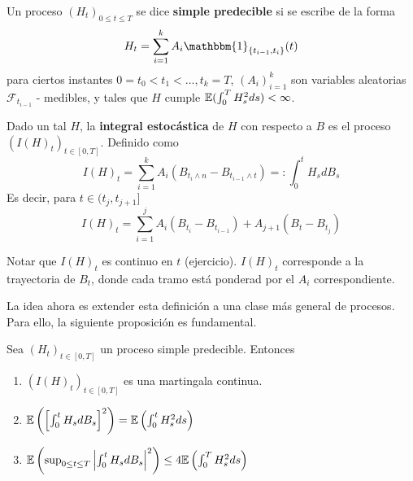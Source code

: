 \begin{definition}
        Un proceso $(H_t)_{0 \le  t \le T}$ se dice \textbf{simple predecible} si se escribe de la forma 
        \begin{equation*}
                H_t = \sum_{i=1}^{k} A_i \mathbbm{1}_{\{ t_{i-1}, t_i \}} (t)
        \end{equation*}
        para ciertos instantes $0 = t_0 < t_1 < \ldots, t_k = T$, $(A_i)_{i=1}^{k}$ son variables 
        aleatorias $\mathcal{F}_{t_{i -1}}$ - medibles, y tales que $H$ cumple $\mathbb{E}(
        \int_{0}^{T} H_s^{2} ds) < \infty$.
\end{definition}

\begin{definition}
        Dado un tal $H$, la \textbf{integral estocástica} de $H$ con respecto a
        $B$ es el proceso $\left(I(H)_t \right)_{t \in [0,T]}$. Definido como 
        \begin{equation*}
                I(H)_t = \sum_{i=1}^{k} A_i \left( B_{t_i \wedge n} - B_{t_{i-1} \wedge t} \right) 
                =: \int_{0}^{t} H_s dB_s
        \end{equation*}
        Es decir, para $t \in (t_j, t_{j+1}]$ 
        \begin{equation*}
                I(H)_t = \sum_{i=1}^{j} A_i\left( B_{t_i} - B_{t_{i-1}}  \right) + A_{j+1}(B_t - B_{t_{j}})
        \end{equation*}
\end{definition}

Notar que $I(H)_t$ es continuo en $t$ (ejercicio). $I(H)_{t}$ corresponde a la trayectoria de $B_t$, donde 
cada tramo está ponderad por el $A_i$ correspondiente. 

\newp La idea ahora es extender esta definición a una clase más general de procesos. Para ello, la siguiente
proposición es fundamental. 

\begin{proposition}
        Sea $(H_t)_{t \in [0,T]} $ un proceso simple predecible. Entonces
        \begin{enumerate}
                \item \label{ie:i}$(I(H)_t)_{t \in [0,T]}$ es una martingala continua. 
                \item \label{ie:ii} $\mathbb{E} \left( \left[ \int_{0}^{t} H_s dB_s   \right]^{2} \right)
                        = \mathbb{E} \left( \int_{0}^{t} H^2_s ds\right)$
                \item \label{ie:iii} $\mathbb{E} \left( \sup_{0 \le  t \le T} \abs{
                                \int_{0}^{t} H_s dB_s}^{2} \right)   \le  4 \mathbb{E}
                        \left( \int_{0}^{T} H^2_s ds \right)  $  
        \end{enumerate}
\end{proposition}

